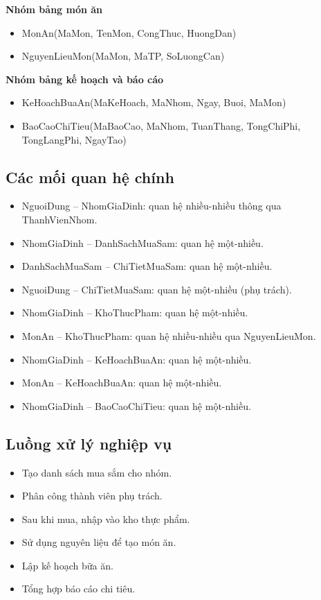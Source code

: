 \documentclass[12pt,a4paper]{report}
\begin{document}
\textbf{Nhóm bảng món ăn}
\begin{itemize}
    \item MonAn(MaMon, TenMon, CongThuc, HuongDan)
    \item NguyenLieuMon(MaMon, MaTP, SoLuongCan)
\end{itemize}

\textbf{Nhóm bảng kế hoạch và báo cáo}
\begin{itemize}
    \item KeHoachBuaAn(MaKeHoach, MaNhom, Ngay, Buoi, MaMon)
    \item BaoCaoChiTieu(MaBaoCao, MaNhom, TuanThang, TongChiPhi, TongLangPhi, NgayTao)
\end{itemize}

\subsection{Các mối quan hệ chính}

\begin{itemize}
    \item NguoiDung -- NhomGiaDinh: quan hệ nhiều-nhiều thông qua ThanhVienNhom.
    \item NhomGiaDinh -- DanhSachMuaSam: quan hệ một-nhiều.
    \item DanhSachMuaSam -- ChiTietMuaSam: quan hệ một-nhiều.
    \item NguoiDung -- ChiTietMuaSam: quan hệ một-nhiều (phụ trách).
    \item NhomGiaDinh -- KhoThucPham: quan hệ một-nhiều.
    \item MonAn -- KhoThucPham: quan hệ nhiều-nhiều qua NguyenLieuMon.
    \item NhomGiaDinh -- KeHoachBuaAn: quan hệ một-nhiều.
    \item MonAn -- KeHoachBuaAn: quan hệ một-nhiều.
    \item NhomGiaDinh -- BaoCaoChiTieu: quan hệ một-nhiều.
\end{itemize}

\subsection{Luồng xử lý nghiệp vụ}

\begin{itemize}
    \item Tạo danh sách mua sắm cho nhóm.
    \item Phân công thành viên phụ trách.
    \item Sau khi mua, nhập vào kho thực phẩm.
    \item Sử dụng nguyên liệu để tạo món ăn.
    \item Lập kế hoạch bữa ăn.
    \item Tổng hợp báo cáo chi tiêu.
\end{itemize}
\end{document}
